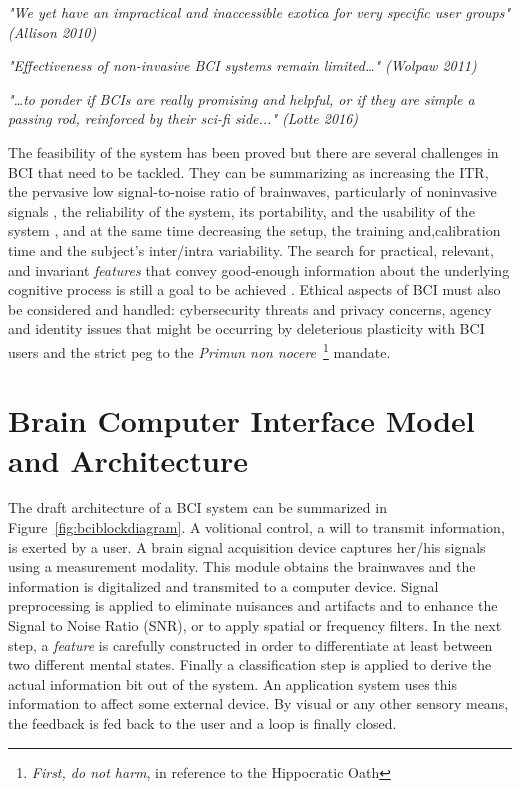 \vspace{8px}

\textit{"We yet have an impractical and inaccessible exotica for very specific user groups" (Allison 2010)}

\vspace{10px}

\textit{"Effectiveness of non-invasive BCI systems remain limited…" (Wolpaw 2011)}

\vspace{10px}

\textit{"…to ponder if BCIs are really promising and helpful, or if they are simple a passing rod, reinforced by their sci-fi side..." (Lotte 2016)}

\vspace{10px}

The feasibility of the system has been proved but there are several challenges in BCI that need to be tackled. They can be summarizing as 
increasing the ITR, the pervasive low signal-to-noise ratio of brainwaves, particularly of noninvasive signals \cite{Lotte2018}, the reliability of the system, its portability, and the usability of the system \cite{Wang2018}, and at the same time decreasing the setup, the training and,calibration time and the subject's inter/intra variability. The search for practical, relevant, and invariant \textit{features} that convey good-enough information about the underlying cognitive process is still a goal to be achieved \cite{Perdikis2014}.  Ethical aspects of BCI \cite{Yuste2017} must also be considered and handled: cybersecurity threats and privacy concerns,  agency and identity issues that might be occurring by deleterious plasticity with BCI users and the strict peg to the \textit{Primun non nocere}~\footnote{\textit{First, do not harm}, in reference to the Hippocratic Oath} mandate.

\section{Brain Computer Interface Model and Architecture}

The draft architecture of a BCI system can be summarized in Figure~\ref{fig:bciblockdiagram}.  A volitional control, a will to transmit information, is exerted by a user. A brain signal acquisition device captures her/his signals using a measurement modality.  This module obtains the brainwaves and the information is digitalized and transmited to a computer device.  Signal preprocessing is applied to eliminate nuisances and artifacts and to enhance the Signal to Noise Ratio (SNR), or to apply spatial or frequency filters.  In the next step, a \textit{feature} is carefully constructed in order to differentiate at least between two different mental states.  Finally a classification step is applied to derive the actual information bit out of the system.   An application system uses this information to affect some external device.  By visual or any other sensory means, the feedback is fed back to the user and a loop is finally closed.

